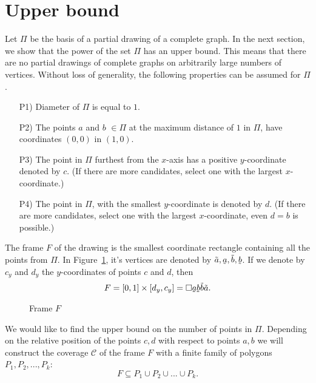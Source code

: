 \section{Upper bound}
Let $\Pi $ be the basis of a partial drawing of a complete graph. In the next section, we show that the power of the set $\Pi$ has an upper bound. This means that there are no partial drawings of complete graphs on arbitrarily large numbers of vertices. Without loss of generality, the following properties can be assumed for $\Pi$.

\begin{properties}
\leavevmode
\begin{itemize}
  \item[P1)] Diameter of $\Pi$ is equal to $1$.
  \item[P2)] The points $a$ and $b$ $\in \Pi$ at the maximum distance of $1$ in $\Pi$, have coordinates $(0,0)$ in $(1,0)$.
  \item[P3)] The point in $\Pi$ furthest from the $x$-axis has a positive $y$-coordinate denoted by $c$. (If there are more candidates, select one with the largest $x$-coordinate.)
  \item[P4)] The point in $\Pi$, with the smallest $y$-coordinate is denoted by $d$. (If there are more candidates, select one with the largest $x$-coordinate, even $d = b$ is possible.)
\end{itemize}
\label{list: properties}
\end{properties}

\begin{definition}[Frame]
\label{def: frame}
The frame $F$ of the drawing is the smallest coordinate rectangle containing all the points from $\Pi$. In Figure~\ref{fig: frame}, it's vertices are denoted by $\abovesym{a}, \undersym{a}, \abovesym{b}, \undersym{b}$. If we denote by $c_{y}$ and $d_{y}$ the $y$-coordinates of points $c$ and $d$, then
\begin{equation*}
F = {[0,1] \times [d_{y}, c_{y}]} =
\rectansym{\undersym{a}\undersym{b}\abovesym{b}\abovesym{a}}.
\end{equation*}
\end{definition}

\begin{figure}
\centering

\caption{Frame $F$}
\label{fig: frame}
\end{figure}

We would like to find the upper bound on the number of points in $\Pi$. Depending on the relative position of the points $c, d$ with respect to points $a, b$ we will construct the coverage $\mathcal{C}$ of the frame $F$ with a finite family of polygons $P_{1}, P_{2}, ..., P_{k}$:
$$
  F \subseteq P_{1} \cup P_{2} \cup ... \cup P_{k}.
$$


